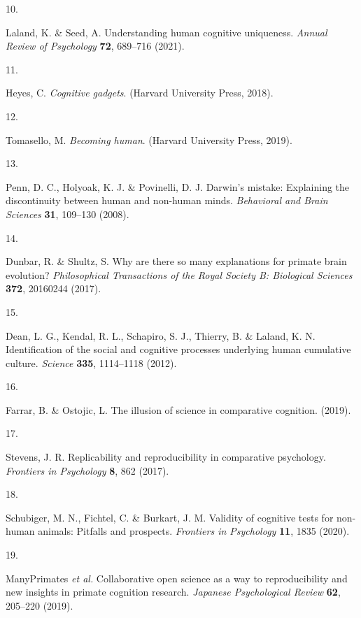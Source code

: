 \documentclass[
  man,floatsintext]{apa6}
\newlength{\cslhangindent}
\newlength{\csllabelwidth}
\newlength{\cslentryspacingunit} %
\newenvironment{CSLReferences}[2] %
 {%
  \setlength{\parindent}{0pt}
  \ifodd #1
  \let\oldpar\par
  \def\par{\hangindent=\cslhangindent\oldpar}
  \fi
  \setlength{\parskip}{#2\cslentryspacingunit}
 }%
 {}
\newcommand{\CSLLeftMargin}[1]{\parbox[t]{\csllabelwidth}{#1}}
\newcommand{\CSLRightInline}[1]{\parbox[t]{\linewidth - \csllabelwidth}{#1}\break}
\begin{document}
\begin{CSLReferences}{0}{0}
\leavevmode{}%
\CSLLeftMargin{10. }%
\CSLRightInline{Laland, K. \& Seed, A. Understanding human cognitive uniqueness. \emph{Annual Review of Psychology} \textbf{72}, 689--716 (2021).}

\leavevmode{}%
\CSLLeftMargin{11. }%
\CSLRightInline{Heyes, C. \emph{Cognitive gadgets}. (Harvard University Press, 2018).}

\leavevmode{}%
\CSLLeftMargin{12. }%
\CSLRightInline{Tomasello, M. \emph{Becoming human}. (Harvard University Press, 2019).}

\leavevmode{}%
\CSLLeftMargin{13. }%
\CSLRightInline{Penn, D. C., Holyoak, K. J. \& Povinelli, D. J. Darwin's mistake: Explaining the discontinuity between human and non-human minds. \emph{Behavioral and Brain Sciences} \textbf{31}, 109--130 (2008).}

\leavevmode{}%
\CSLLeftMargin{14. }%
\CSLRightInline{Dunbar, R. \& Shultz, S. Why are there so many explanations for primate brain evolution? \emph{Philosophical Transactions of the Royal Society B: Biological Sciences} \textbf{372}, 20160244 (2017).}

\leavevmode{}%
\CSLLeftMargin{15. }%
\CSLRightInline{Dean, L. G., Kendal, R. L., Schapiro, S. J., Thierry, B. \& Laland, K. N. Identification of the social and cognitive processes underlying human cumulative culture. \emph{Science} \textbf{335}, 1114--1118 (2012).}

\leavevmode{}%
\CSLLeftMargin{16. }%
\CSLRightInline{Farrar, B. \& Ostojic, L. The illusion of science in comparative cognition. (2019).}

\leavevmode{}%
\CSLLeftMargin{17. }%
\CSLRightInline{Stevens, J. R. Replicability and reproducibility in comparative psychology. \emph{Frontiers in Psychology} \textbf{8}, 862 (2017).}

\leavevmode{}%
\CSLLeftMargin{18. }%
\CSLRightInline{Schubiger, M. N., Fichtel, C. \& Burkart, J. M. Validity of cognitive tests for non-human animals: Pitfalls and prospects. \emph{Frontiers in Psychology} \textbf{11}, 1835 (2020).}

\leavevmode{}%
\CSLLeftMargin{19. }%
\CSLRightInline{ManyPrimates \emph{et al.} Collaborative open science as a way to reproducibility and new insights in primate cognition research. \emph{Japanese Psychological Review} \textbf{62}, 205--220 (2019).}


\end{CSLReferences}
\end{document}
